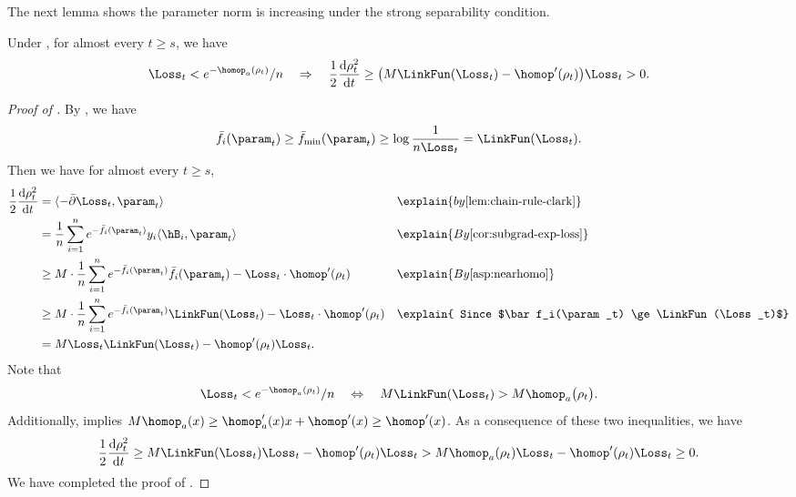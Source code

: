 The next lemma shows the parameter norm is increasing under the strong separability condition.
\begin{lemma}
\label{lem:NH-rho-increase}
Under , for almost every $t\ge s$, 
we have 
\[
\Loss_t < e^{-\homop_a(\rho_t)}/n \quad 
\Rightarrow\quad 
    \frac{1}{2} \frac{\mathrm{d}\rho_t^2}{\mathrm{d}t} \ge  \big( M  \LinkFun(\Loss_t) - \homop^\prime (\rho_t)\big) \Loss_t > 0.
\]
\end{lemma}
\begin{proof}[Proof of ]
By , we have
\begin{equation*}
        \bar f_i(\param_t) \ge \bar f_{\min}(\param_t) \ge \log \frac{1}{n \Loss_t} = \LinkFun(\Loss_t). 
\end{equation*}
Then we have for almost every $t\ge s$,
\begin{align*}
\frac{1}{2} \frac{\mathrm{d}\rho_t^2}{\mathrm{d}t}
& = \langle -\bar \partial \Loss_t, \param_t \rangle  &&\explain{ by \Cref{lem:chain-rule-clark} } \\ 
& = \frac{1}{n}\sum_{i=1}^n e^{-\bar f_i(\param_t)} y_i  \langle \hB_i, \param_t \rangle 
&&\explain{ By \Cref{cor:subgrad-exp-loss}} \\
& \ge M \cdot \frac{1}{n}\sum_{i=1}^n e^{-\bar f_i(\param_t)} \bar f_i(\param_t) - \Loss_t \cdot \homop^{\prime}(\rho_t) &&\explain{ By  \Cref{asp:nearhomo}} \\
& \ge M \cdot\frac{1}{n}\sum_{i=1}^n e^{-\bar f_i(\param_t)} \LinkFun(\Loss_t) - \Loss_t \cdot \homop^{\prime}(\rho_t) &&\explain{ Since $\bar f_i(\param_t) \ge\LinkFun(\Loss_t)$} \\ 
& =   M \Loss_t \LinkFun(\Loss_t) - \homop^{\prime}(\rho_t)\Loss_t. 
\end{align*}
Note that
\begin{equation*}
    \Loss_t < e^{-\homop_a(\rho_t)}/n \quad 
    \Leftrightarrow \quad 
    M \LinkFun(\Loss_t)  >   M \homop_a \big(\rho_t \big).
\end{equation*}
Additionally,   implies $M \homop_a(x) \ge \homop_a^\prime (x) x+ \homop^\prime(x)\ge \homop^\prime(x)$. 
As a consequence of these two inequalities, we have
\[
    \frac{1}{2} \frac{\mathrm{d}\rho_t^2}{\mathrm{d}t}  \ge  M\LinkFun(\Loss_t) \Loss_t - \homop^{\prime}(\rho_t)\Loss_t  >   M \homop_a (\rho_t) \Loss_t -\homop^{\prime}(\rho_t)\Loss_t \ge 0.
\]
 We have completed the proof of . 
\end{proof}


